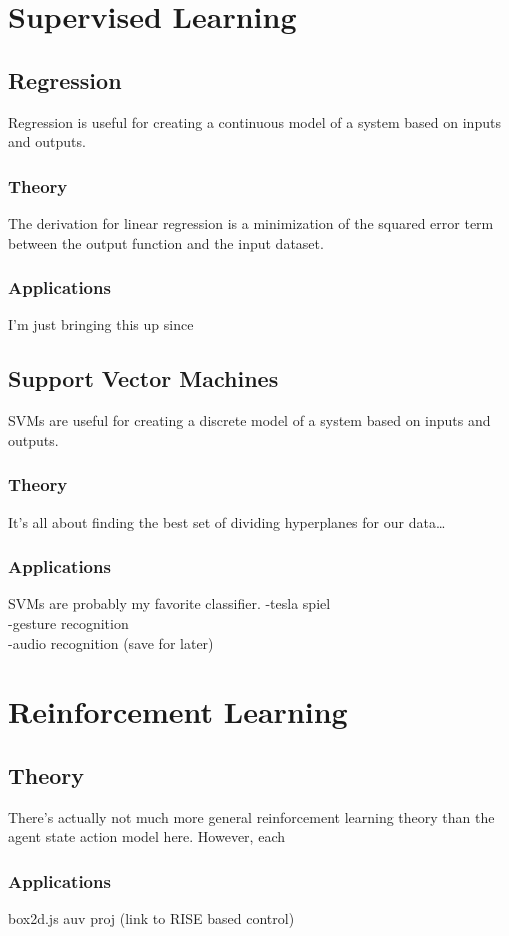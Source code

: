 \documentclass[11pt]{article}
\begin{document}
\section{Supervised Learning}
\subsection{Regression}
Regression is useful for creating a continuous model of a system based on inputs and outputs.
\subsubsection{Theory}
The derivation for linear regression is a minimization of the squared error term between the output function and the input dataset.
\subsubsection{Applications}
I'm just bringing this up since 
\subsection{Support Vector Machines}
SVMs are useful for creating a discrete model of a system based on inputs and outputs.
\subsubsection{Theory}
It's all about finding the best set of dividing hyperplanes for our data\ldots
\subsubsection{Applications}
SVMs are probably my favorite classifier.
-tesla spiel \\
-gesture recognition \\
-audio recognition (save for later) \\

\section{Reinforcement Learning}
\subsection{Theory}
There's actually not much more general reinforcement learning theory than the agent state action model here. However, each 
\subsubsection{Applications}
box2d.js
auv proj (link to RISE based control)
\end{document}
